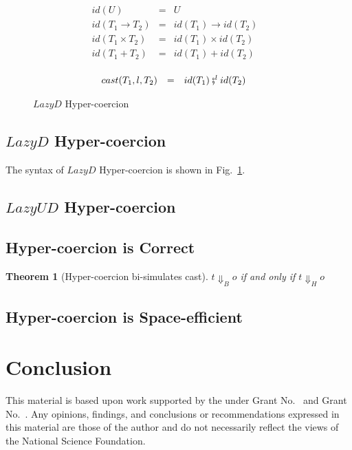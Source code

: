 \documentclass[acmsmall,review,anonymous]{acmart}\settopmatter{printfolios=true,printccs=false,printacmref=false}
\newtheorem{theorem}{Theorem}[section]
\newcommand{\figref}[1]{Fig.~\ref{#1}}
\newcommand{\funrule}[3]{#1 & = & #2 & #3\\}
\newcommand{\plus}[0]{+}
\begin{document}
\begin{figure}
	\[
	\begin{array}{rclr}
	\funrule{id(U)}{U}{}
	\funrule{id(T_1 \rightarrow T_2)}{
		id(T_1) \rightarrow id(T_2)
	}{}
	\funrule{id(T_1 \times T_2)}{
		id(T_1) \times id(T_2)
	}{}
	\funrule{id(T_1 \plus T_2)}{
		id(T_1) \plus id(T_2)
	}{}
	\end{array}
	\]
	
	\[
	\begin{array}{rclr}
	\funrule{cast(T_1,l,T_2)}{
		id(T_1) \fatsemi^l id(T_2)
	}{}
	\end{array}
	\]
	

	\caption{$Lazy D$ Hyper-coercion}
	\label{fig:HC-D}
\end{figure}

\subsection{$Lazy D$ Hyper-coercion}

The syntax of $ Lazy D $ Hyper-coercion is shown in \figref{fig:HC-D}.

\subsection{$Lazy UD$ Hyper-coercion}

\subsection{Hyper-coercion is Correct}

\begin{theorem}[Hyper-coercion bi-simulates cast]	
	$ t \Downarrow_B o $ if and only if $ t \Downarrow_H o $
\end{theorem}

\subsection{Hyper-coercion is Space-efficient}

\section{Conclusion} \label{sec:conclude}

\begin{acks}                            %
  This material is based upon work supported by the
   under Grant
  No.~ and Grant
  No.~.  Any opinions, findings, and
  conclusions or recommendations expressed in this material are those
  of the author and do not necessarily reflect the views of the
  National Science Foundation.
\end{acks}
\end{document}

